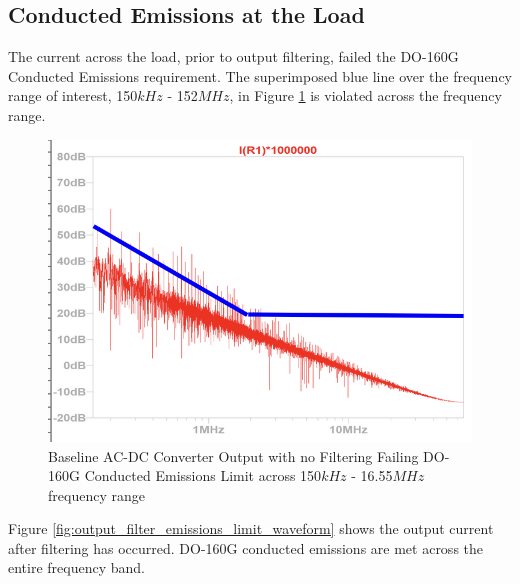 \documentclass[conference]{IEEEtran}
\begin{document}
\FloatBarrier

\subsection{Conducted Emissions at the Load}
The current across the load, prior to output filtering, failed the DO-160G Conducted Emissions requirement. The superimposed blue line over the frequency range of interest, 150$kHz$ - 152$MHz$, in Figure \ref{fig:no_output_filter_emissions_limit_waveform} is violated across the frequency range.

\begin{figure}[h]
    \centering
    \includegraphics[width=1.0\linewidth]{no_output_filter_emissions_limit.png}
    \caption{Baseline AC-DC Converter Output with no Filtering Failing DO-160G Conducted Emissions Limit across 150$kHz$ - 16.55$MHz$ frequency range}
    \label{fig:no_output_filter_emissions_limit_waveform}
\end{figure}

Figure \ref{fig:output_filter_emissions_limit_waveform} shows the output current after filtering has occurred. DO-160G conducted emissions are met across the entire frequency band.
\end{document}
